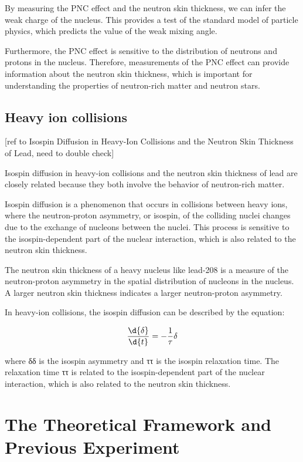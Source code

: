 By measuring the PNC effect and the neutron skin thickness, we can infer the weak charge of the nucleus. This provides a test of the standard model of particle physics, which predicts the value of the weak mixing angle.

Furthermore, the PNC effect is sensitive to the distribution of neutrons and protons in the nucleus. Therefore, measurements of the PNC effect can provide information about the neutron skin thickness, which is important for understanding the properties of neutron-rich matter and neutron stars.

\subsection{Heavy ion collisions }
[ref to Isospin Diffusion in Heavy-Ion Collisions and the Neutron Skin Thickness of Lead, need to double check]

Isospin diffusion in heavy-ion collisions and the neutron skin thickness of lead are closely related because they both involve the behavior of neutron-rich matter.

Isospin diffusion is a phenomenon that occurs in collisions between heavy ions, where the neutron-proton asymmetry, or isospin, of the colliding nuclei changes due to the exchange of nucleons between the nuclei. This process is sensitive to the isospin-dependent part of the nuclear interaction, which is also related to the neutron skin thickness.

The neutron skin thickness of a heavy nucleus like lead-208 is a measure of the neutron-proton asymmetry in the spatial distribution of nucleons in the nucleus. A larger neutron skin thickness indicates a larger neutron-proton asymmetry.

In heavy-ion collisions, the isospin diffusion can be described by the equation:

\begin{equation}
    \frac{\d{\delta}}{\d{t}} = - \frac{1}{\tau}\delta
\end{equation}

where δδ is the isospin asymmetry and ττ is the isospin relaxation time. The relaxation time ττ is related to the isospin-dependent part of the nuclear interaction, which is also related to the neutron skin thickness.


\section{The Theoretical Framework and Previous Experiment}

